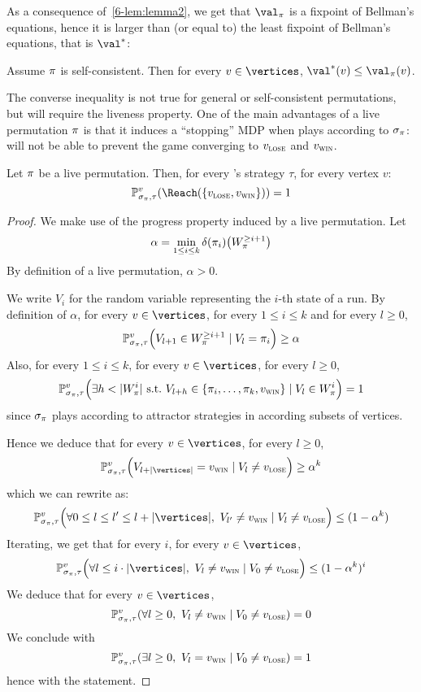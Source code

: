 As a consequence of~\cref{6-lem:lemma2}, we get that $\val_\perm$
is a fixpoint of Bellman's equations, hence it is larger than (or
equal to) the least fixpoint of Bellman's equations, that is $\val^*$:

\begin{corollary}
  Assume $\pi$ is self-consistent.  Then for every $v \in
  \vertices$, $\val^*(v) \le \val_\perm(v)$.
\end{corollary}

The converse inequality is not true for general or self-consistent
permutations, but will require the liveness property. One of the main
advantages of a live permutation $\pi$ is that it induces a
``stopping'' MDP when \Eve plays according to $\sigma_\pi$: \Adam
will not be able to prevent the game converging to $v_{\textsc{lose}}$ and $v_{\textsc{win}}$.

\begin{lemma}
  \label{stoch:lemma:stopping}
  Let $\pi$ be a live permutation. Then, for every \Adam's strategy
  $\tau$, for every vertex $v$:
  \[
  \probm^v_{\sigma_\perm,\tau} (\Reach(\{\vlose,\vwin\})) = 1
  \]
\end{lemma}

\begin{proof}
  We make use of the progress property induced by a live permutation.
  Let
  \[
  \alpha = \min_{1 \le i \le k} \delta(\pi_i) \big(W_\pi^{\ge
    i+1}\big)
  \]
  By definition of a live permutation, $\alpha>0$.

  We write $V_i$ for the random variable representing the $i$-th state
  of a run.
  By definition of $\alpha$, for every $v \in \vertices$, for every $1
  \le i \le k$ and for every $l \ge 0$,
  \[
  \mathbb{P}^v_{\sigma_\pi,\tau}\Big(V_{l+1} \in W_\pi^{\ge i+1} \mid
  V_l = \pi_i\Big) \ge \alpha
  \]
  Also, for every $1 \le i \le k$, for every $v \in \vertices$, for
  every $l \ge 0$,
  \[
  \mathbb{P}^v_{\sigma_\pi,\tau}\Big(\exists h < |W_\pi^i|\
  \text{s.t.}\ V_{l+h} \in \{\pi_i,\ldots,\pi_k,v_{\textsc{win}}\} \mid V_l
  \in W_\pi^i\Big)=1
  \]
  since $\sigma_\pi$ plays according to attractor strategies in
  according subsets of vertices.

  Hence we deduce that for every $v \in \vertices$, for every $l \ge
  0$,
  \[
  \probm^v_{\sigma_\perm,\tau}\Big(V_{l+|\vertices|}=\vwin \mid V_l
  \ne \vlose\Big) \ge \alpha^k
  \]
  which we can rewrite as:
  \[
  \probm^v_{\sigma_\perm,\tau}\Big(\forall 0 \le l \le l' \le
  l+|\vertices|,\ V_{l'} \ne \vwin \mid V_l \ne \vlose\Big) \le
  (1-\alpha^k)
  \]
  Iterating, we get that for every $i$, for every $v \in \vertices$,
  \[
  \probm^v_{\sigma_\perm,\tau}\Big(\forall l \le i \cdot |\vertices|,\
  V_{l} \ne \vwin \mid V_0 \ne \vlose\Big) \le (1-\alpha^k)^i
  \]
  We  deduce that for every $v \in \vertices$,
  \[
  \probm^v_{\sigma_\perm,\tau}(\forall l \ge 0,\ V_l \ne \vwin \mid
  V_0 \ne \vlose) = 0
  \]
  We conclude with
  \[
  \probm^v_{\sigma_\perm,\tau}(\exists l \ge 0,\ V_l = \vwin \mid V_0
  \ne \vlose) = 1
  \]
  hence with the statement.
\end{proof}


